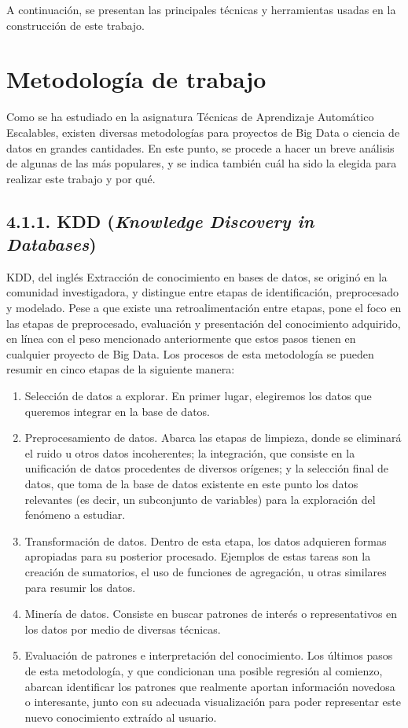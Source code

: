 
A continuación, se presentan las principales técnicas y herramientas usadas en la construcción de este trabajo.

\section{Metodología de trabajo}

Como se ha estudiado en la asignatura \guillemotleft Técnicas de Aprendizaje Automático Escalables\guillemotright, existen diversas metodologías para proyectos de Big Data o ciencia de datos en grandes cantidades. En este punto, se procede a hacer un breve análisis de algunas de las más populares, y se indica también cuál ha sido la elegida para realizar este trabajo y por qué.

\subsection{4.1.1. KDD (\textit{Knowledge Discovery in Databases})}

KDD, del inglés \guillemotleft Extracción de conocimiento en bases de datos\guillemotright, se originó en la comunidad investigadora, y distingue entre etapas de identificación, preprocesado y modelado. Pese a que existe una retroalimentación entre etapas, pone el foco en las etapas de preprocesado, evaluación y presentación del conocimiento adquirido, en línea con el peso mencionado anteriormente que estos pasos tienen en cualquier proyecto de Big Data. Los procesos de esta metodología se pueden resumir en cinco etapas de la siguiente manera:

\begin{enumerate}
    \item Selección de datos a explorar. En primer lugar, elegiremos los datos que queremos integrar en la base de datos.
    \item Preprocesamiento de datos. Abarca las etapas de limpieza, donde se eliminará el ruido u otros datos incoherentes; la integración, que consiste en la unificación de datos procedentes de diversos orígenes; y la selección final de datos, que toma de la base de datos existente en este punto los datos relevantes (es decir, un subconjunto de variables) para la exploración del fenómeno a estudiar.
    \item Transformación de datos. Dentro de esta etapa, los datos adquieren formas apropiadas para su posterior procesado. Ejemplos de estas tareas son la creación de sumatorios, el uso de funciones de agregación, u otras similares para resumir los datos.
    \item Minería de datos. Consiste en buscar patrones de interés o representativos en los datos por medio de diversas técnicas.
    \item Evaluación de patrones e interpretación del conocimiento. Los últimos pasos de esta metodología, y que condicionan una posible regresión al comienzo, abarcan identificar los patrones que realmente aportan información novedosa o interesante, junto con su adecuada visualización para poder representar este nuevo conocimiento extraído al usuario.
\end{enumerate}

